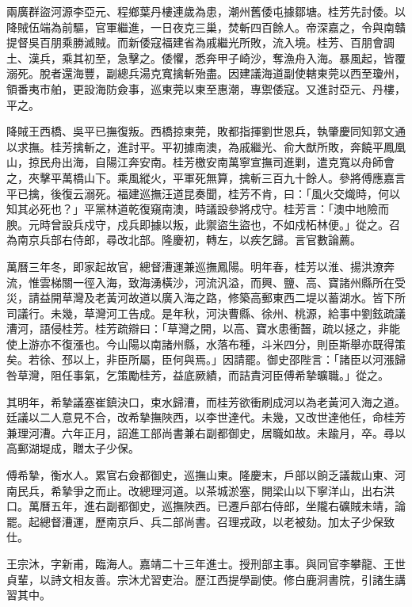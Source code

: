 \begin{pinyinscope}
{{兩廣群盜河源李亞元、程鄉葉丹樓連歲為患，潮州舊倭屯據鄒塘。桂芳先討倭。以降賊伍端為前驅，官軍繼進，一日夜克三巢，焚斬四百餘人。帝深嘉之，令與南贛提督吳百朋乘勝滅賊。而新倭寇福建省為戚繼光所敗，流入境。桂芳、百朋會調土、漢兵，乘其初至，急擊之。倭懼，悉奔甲子崎沙，奪漁舟入海。暴風起，皆覆溺死。脫者還海豐，副總兵湯克寬擒斬殆盡。因建議海道副使轄東莞以西至瓊州，領番夷市舶，更設海防僉事，巡東莞以東至惠潮，專禦倭寇。又進討亞元、丹樓，平之。

降賊王西橋、吳平已撫復叛。西橋掠東莞，敗都指揮劉世恩兵，執肇慶同知郭文通以求撫。桂芳擒斬之，進討平。平初據南澳，為戚繼光、俞大猷所敗，奔饒平鳳凰山，掠民舟出海，自陽江奔安南。桂芳檄安南萬寧宣撫司進剿，遣克寬以舟師會之，夾擊平萬橋山下。乘風縱火，平軍死無算，擒斬三百九十餘人。參將傅應嘉言平已擒，後復云溺死。福建巡撫汪道昆奏聞，桂芳不肯，曰：「風火交熾時，何以知其必死也？」平黨林道乾復窺南澳，時議設參將戍守。桂芳言：「澳中地險而腴。元時曾設兵戍守，戍兵即據以叛，此禦盜生盜也，不如戍柘林便。」從之。召為南京兵部右侍郎，尋改北部。隆慶初，轉左，以疾乞歸。言官數論薦。

萬曆三年冬，即家起故官，總督漕運兼巡撫鳳陽。明年春，桂芳以淮、揚洪潦奔流，惟雲梯關一徑入海，致海湧橫沙，河流汎溢，而興、鹽、高、寶諸州縣所在受災，請益開草灣及老黃河故道以廣入海之路，修築高郵東西二堤以蓄湖水。皆下所司議行。未幾，草灣河工告成。是年秋，河決曹縣、徐州、桃源，給事中劉鉉疏議漕河，語侵桂芳。桂芳疏辯曰：「草灣之開，以高、寶水患衝齧，疏以拯之，非能使上游亦不復漲也。今山陽以南諸州縣，水落布種，斗米四分，則臣斯舉亦既得策矣。若徐、邳以上，非臣所屬，臣何與焉。」因請罷。御史邵陛言：「諸臣以河漲歸咎草灣，阻任事氣，乞策勵桂芳，益底厥績，而詰責河臣傅希摯曠職。」從之。

其明年，希摯議塞崔鎮決口，束水歸漕，而桂芳欲衝刷成河以為老黃河入海之道。廷議以二人意見不合，改希摯撫陜西，以李世達代。未幾，又改世達他任，命桂芳兼理河漕。六年正月，詔進工部尚書兼右副都御史，居職如故。未踰月，卒。尋以高郵湖堤成，贈太子少保。

傅希摯，衡水人。累官右僉都御史，巡撫山東。隆慶末，戶部以餉乏議裁山東、河南民兵，希摯爭之而止。改總理河道。以茶城淤塞，開梁山以下寧洋山，出右洪口。萬曆五年，進右副都御史，巡撫陜西。已遷戶部右侍郎，坐隴右礦賊未靖，論罷。起總督漕運，歷南京戶、兵二部尚書。召理戎政，以老被劾。加太子少保致仕。

王宗沐，字新甫，臨海人。嘉靖二十三年進士。授刑部主事。與同官李攀龍、王世貞輩，以詩文相友善。宗沐尤習吏治。歷江西提學副使。修白鹿洞書院，引諸生講習其中。

}}
\end{pinyinscope}
